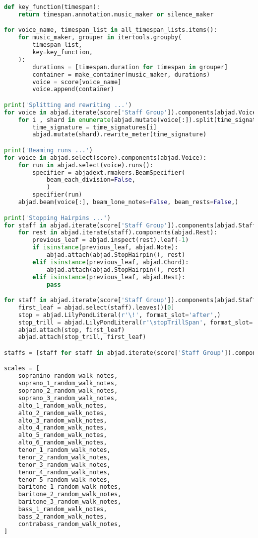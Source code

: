 \begin{lstlisting}[language=Python, caption=Invocation Source Code]
def key_function(timespan):
    return timespan.annotation.music_maker or silence_maker

for voice_name, timespan_list in all_timespan_lists.items():
    for music_maker, grouper in itertools.groupby(
        timespan_list,
        key=key_function,
    ):
        durations = [timespan.duration for timespan in grouper]
        container = make_container(music_maker, durations)
        voice = score[voice_name]
        voice.append(container)

print('Splitting and rewriting ...')
for voice in abjad.iterate(score['Staff Group']).components(abjad.Voice):
    for i , shard in enumerate(abjad.mutate(voice[:]).split(time_signatures)):
        time_signature = time_signatures[i]
        abjad.mutate(shard).rewrite_meter(time_signature)

print('Beaming runs ...')
for voice in abjad.select(score).components(abjad.Voice):
    for run in abjad.select(voice).runs():
        specifier = abjadext.rmakers.BeamSpecifier(
            beam_each_division=False,
            )
        specifier(run)
    abjad.beam(voice[:], beam_lone_notes=False, beam_rests=False,)

print('Stopping Hairpins ...')
for staff in abjad.iterate(score['Staff Group']).components(abjad.Staff):
    for rest in abjad.iterate(staff).components(abjad.Rest):
        previous_leaf = abjad.inspect(rest).leaf(-1)
        if isinstance(previous_leaf, abjad.Note):
            abjad.attach(abjad.StopHairpin(), rest)
        elif isinstance(previous_leaf, abjad.Chord):
            abjad.attach(abjad.StopHairpin(), rest)
        elif isinstance(previous_leaf, abjad.Rest):
            pass

for staff in abjad.iterate(score['Staff Group']).components(abjad.Staff):
    first_leaf = abjad.select(staff).leaves()[0]
    stop = abjad.LilyPondLiteral(r'\!', format_slot='after',)
    stop_trill = abjad.LilyPondLiteral(r'\stopTrillSpan', format_slot='after')
    abjad.attach(stop, first_leaf)
    abjad.attach(stop_trill, first_leaf)

staffs = [staff for staff in abjad.iterate(score['Staff Group']).components(abjad.Staff)]

scales = [
    sopranino_random_walk_notes,
    soprano_1_random_walk_notes,
    soprano_2_random_walk_notes,
    soprano_3_random_walk_notes,
    alto_1_random_walk_notes,
    alto_2_random_walk_notes,
    alto_3_random_walk_notes,
    alto_4_random_walk_notes,
    alto_5_random_walk_notes,
    alto_6_random_walk_notes,
    tenor_1_random_walk_notes,
    tenor_2_random_walk_notes,
    tenor_3_random_walk_notes,
    tenor_4_random_walk_notes,
    tenor_5_random_walk_notes,
    baritone_1_random_walk_notes,
    baritone_2_random_walk_notes,
    baritone_3_random_walk_notes,
    bass_1_random_walk_notes,
    bass_2_random_walk_notes,
    contrabass_random_walk_notes,
]


\end{lstlisting}
